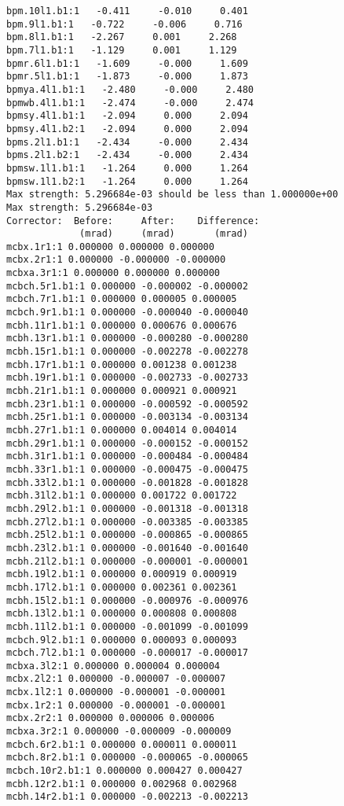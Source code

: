\begin{verbatim}
bpm.10l1.b1:1   -0.411     -0.010     0.401
bpm.9l1.b1:1   -0.722     -0.006     0.716
bpm.8l1.b1:1   -2.267     0.001     2.268
bpm.7l1.b1:1   -1.129     0.001     1.129
bpmr.6l1.b1:1   -1.609     -0.000     1.609
bpmr.5l1.b1:1   -1.873     -0.000     1.873
bpmya.4l1.b1:1   -2.480     -0.000     2.480
bpmwb.4l1.b1:1   -2.474     -0.000     2.474
bpmsy.4l1.b1:1   -2.094     0.000     2.094
bpmsy.4l1.b2:1   -2.094     0.000     2.094
bpms.2l1.b1:1   -2.434     -0.000     2.434
bpms.2l1.b2:1   -2.434     -0.000     2.434
bpmsw.1l1.b1:1   -1.264     0.000     1.264
bpmsw.1l1.b2:1   -1.264     0.000     1.264
Max strength: 5.296684e-03 should be less than 1.000000e+00
Max strength: 5.296684e-03
Corrector:  Before:     After:    Difference:
             (mrad)     (mrad)       (mrad)  
mcbx.1r1:1 0.000000 0.000000 0.000000
mcbx.2r1:1 0.000000 -0.000000 -0.000000
mcbxa.3r1:1 0.000000 0.000000 0.000000
mcbch.5r1.b1:1 0.000000 -0.000002 -0.000002
mcbch.7r1.b1:1 0.000000 0.000005 0.000005
mcbch.9r1.b1:1 0.000000 -0.000040 -0.000040
mcbh.11r1.b1:1 0.000000 0.000676 0.000676
mcbh.13r1.b1:1 0.000000 -0.000280 -0.000280
mcbh.15r1.b1:1 0.000000 -0.002278 -0.002278
mcbh.17r1.b1:1 0.000000 0.001238 0.001238
mcbh.19r1.b1:1 0.000000 -0.002733 -0.002733
mcbh.21r1.b1:1 0.000000 0.000921 0.000921
mcbh.23r1.b1:1 0.000000 -0.000592 -0.000592
mcbh.25r1.b1:1 0.000000 -0.003134 -0.003134
mcbh.27r1.b1:1 0.000000 0.004014 0.004014
mcbh.29r1.b1:1 0.000000 -0.000152 -0.000152
mcbh.31r1.b1:1 0.000000 -0.000484 -0.000484
mcbh.33r1.b1:1 0.000000 -0.000475 -0.000475
mcbh.33l2.b1:1 0.000000 -0.001828 -0.001828
mcbh.31l2.b1:1 0.000000 0.001722 0.001722
mcbh.29l2.b1:1 0.000000 -0.001318 -0.001318
mcbh.27l2.b1:1 0.000000 -0.003385 -0.003385
mcbh.25l2.b1:1 0.000000 -0.000865 -0.000865
mcbh.23l2.b1:1 0.000000 -0.001640 -0.001640
mcbh.21l2.b1:1 0.000000 -0.000001 -0.000001
mcbh.19l2.b1:1 0.000000 0.000919 0.000919
mcbh.17l2.b1:1 0.000000 0.002361 0.002361
mcbh.15l2.b1:1 0.000000 -0.000976 -0.000976
mcbh.13l2.b1:1 0.000000 0.000808 0.000808
mcbh.11l2.b1:1 0.000000 -0.001099 -0.001099
mcbch.9l2.b1:1 0.000000 0.000093 0.000093
mcbch.7l2.b1:1 0.000000 -0.000017 -0.000017
mcbxa.3l2:1 0.000000 0.000004 0.000004
mcbx.2l2:1 0.000000 -0.000007 -0.000007
mcbx.1l2:1 0.000000 -0.000001 -0.000001
mcbx.1r2:1 0.000000 -0.000001 -0.000001
mcbx.2r2:1 0.000000 0.000006 0.000006
mcbxa.3r2:1 0.000000 -0.000009 -0.000009
mcbch.6r2.b1:1 0.000000 0.000011 0.000011
mcbch.8r2.b1:1 0.000000 -0.000065 -0.000065
mcbch.10r2.b1:1 0.000000 0.000427 0.000427
mcbh.12r2.b1:1 0.000000 0.002968 0.002968
mcbh.14r2.b1:1 0.000000 -0.002213 -0.002213

\end{verbatim}
